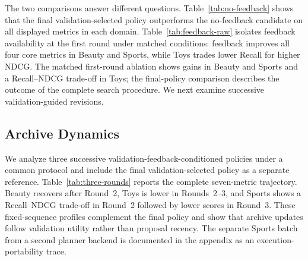 The two comparisons answer different questions. Table~\ref{tab:no-feedback} shows that the final validation-selected policy outperforms the no-feedback candidate on all displayed metrics in each domain. Table~\ref{tab:feedback-raw} isolates feedback availability at the first round under matched conditions: feedback improves all four core metrics in Beauty and Sports, while Toys trades lower Recall for higher NDCG. The matched first-round ablation shows gains in Beauty and Sports and a Recall--NDCG trade-off in Toys; the final-policy comparison describes the outcome of the complete search procedure. We next examine successive validation-guided revisions.

\subsection{Archive Dynamics}
\label{sec:archive-analysis}

We analyze three successive validation-feedback-conditioned policies under a common protocol and include the final validation-selected policy as a separate reference. Table~\ref{tab:three-rounds} reports the complete seven-metric trajectory. Beauty recovers after Round~2, Toys is lower in Rounds~2--3, and Sports shows a Recall--NDCG trade-off in Round~2 followed by lower scores in Round~3. These fixed-sequence profiles complement the final policy and show that archive updates follow validation utility rather than proposal recency. The separate Sports batch from a second planner backend is documented in the appendix as an execution-portability trace.

